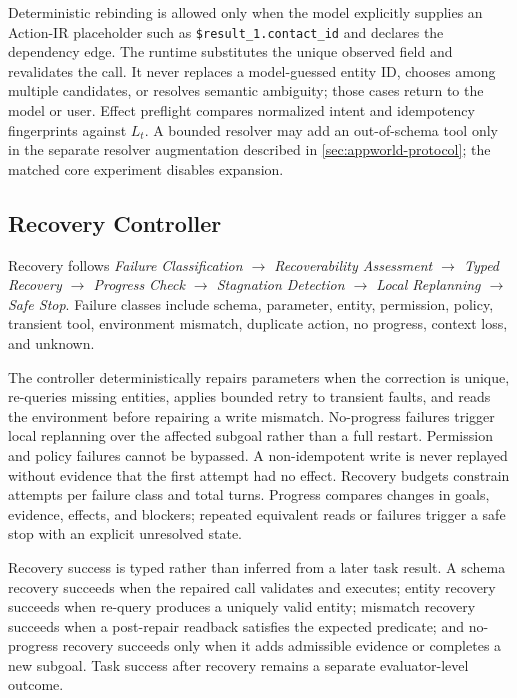 \documentclass[10pt]{article}
\newcommand{\code}[1]{\texttt{#1}}
\begin{document}
Deterministic rebinding is allowed only when the model explicitly supplies an
Action-IR placeholder such as \code{\$result\_1.contact\_id} and declares the
dependency edge. The runtime substitutes the unique observed field and revalidates
the call. It never replaces a model-guessed entity ID, chooses among multiple
candidates, or resolves semantic ambiguity; those cases return to the model or
user. Effect preflight compares normalized intent and idempotency fingerprints
against $L_t$. A bounded resolver may add an out-of-schema tool only in the
separate resolver augmentation described in \cref{sec:appworld-protocol}; the
matched core experiment disables expansion.

\subsection{Recovery Controller}

Recovery follows \emph{Failure Classification $\rightarrow$ Recoverability
Assessment $\rightarrow$ Typed Recovery $\rightarrow$ Progress Check
$\rightarrow$ Stagnation Detection $\rightarrow$ Local Replanning
$\rightarrow$ Safe Stop}. Failure classes include schema, parameter, entity,
permission, policy, transient tool, environment mismatch, duplicate action, no
progress, context loss, and unknown.

The controller deterministically repairs parameters when the correction is unique,
re-queries missing entities, applies bounded retry to transient faults, and reads
the environment before repairing a write mismatch. No-progress failures trigger
local replanning over the affected subgoal rather than a full restart. Permission
and policy failures cannot be bypassed. A non-idempotent write is never replayed
without evidence that the first attempt had no effect. Recovery budgets constrain
attempts per failure class and total turns. Progress compares changes in goals,
evidence, effects, and blockers; repeated equivalent reads or failures trigger a
safe stop with an explicit unresolved state.

Recovery success is typed rather than inferred from a later task result. A schema
recovery succeeds when the repaired call validates and executes; entity recovery
succeeds when re-query produces a uniquely valid entity; mismatch recovery succeeds
when a post-repair readback satisfies the expected predicate; and no-progress
recovery succeeds only when it adds admissible evidence or completes a new subgoal.
Task success after recovery remains a separate evaluator-level outcome.
\end{document}
